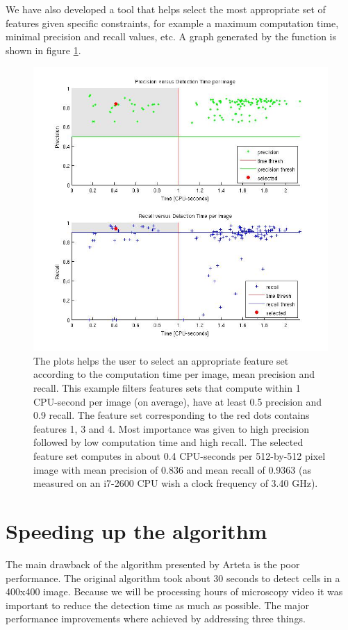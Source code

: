 	We have also developed a tool that helps select the most appropriate set of features given specific constraints, for example a maximum computation time, minimal precision and recall values, etc. A graph generated by the function is shown in figure \ref{fig:bestFeatureSelector}.
	
	\begin{figure}[h]
		\includegraphics[width=\textwidth]{images/best_features}
		\caption{The plots helps the user to select an appropriate feature set according to the computation time per image, mean precision and recall. This example filters features sets that compute within 1 CPU-second per image (on average), have at least 0.5 precision and 0.9 recall. The feature set corresponding to the red dots contains features 1, 3 and 4. Most importance was given to high precision followed by low computation time and high recall. The selected feature set computes in about 0.4 CPU-seconds per 512-by-512 pixel image with mean precision of 0.836 and mean recall of 0.9363 (as measured on an i7-2600 CPU wish a clock frequency of 3.40 GHz).}
	    \label{fig:bestFeatureSelector}
	\end{figure}
	
	\section{Speeding up the algorithm }
	\label{sec:detector_changes}
		The main drawback of the algorithm presented by Arteta \cite{arteta12} is the poor performance. The original algorithm took about 30 seconds to detect cells in a 400x400 image. Because we will be processing hours of microscopy video it was important to reduce the detection time as much as possible.  The major performance improvements where achieved by addressing three things.
		
